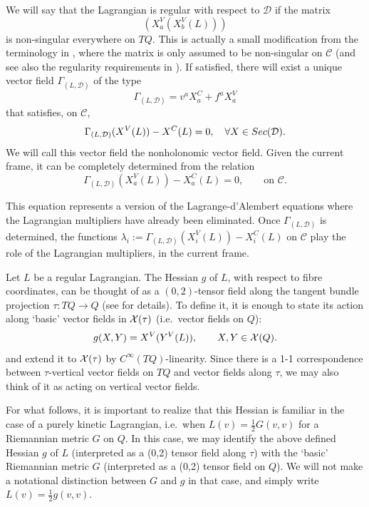 \documentclass[11pt]{article}
\def\cinfty#1{C^{\scriptscriptstyle\infty}(#1)}
\def\vectorfields#1{{\cal X}(#1)}
\def\D{{\mathcal D}}
\def\C{{\mathcal C}}
\def\GLD{{\Gamma_{(L,\mathcal{D})}}}
\begin{document}
We will say that the Lagrangian is regular with respect to $\D$ if the matrix
\[
\left(X^V_a(X^V_b(L))\right)
\]
is non-singular everywhere on $TQ$. This is actually a small modification from the terminology in \cite{anhol,Cartan}, where the matrix is only assumed to be non-singular on $\C$ (and see also the regularity requirements in \cite{deL,Cortes}). If satisfied, there will exist a unique vector field $\GLD$ of the type
$$
\Gamma_{(L,\mathcal{D})}=v^{a} X_{a}^C+f^{a} X_{a}^{V}
$$
that satisfies, on $\C$,  
$$
\Gamma_{(L,\mathcal{D})}(X^V(L))-X^C(L)=0 ,\quad\forall X\in{\rm Sec}(\mathcal{D}).
$$
We will call this vector field the nonholonomic vector field. Given the current frame, it can be completely determined from the relation
$$
\Gamma_{(L,\mathcal{D})}(X^V_a(L))-X^C_a(L)=0, \qquad \mbox{on $\C$}.
$$ 

This equation represents a version of the Lagrange-d'Alembert equations where the Lagrangian multipliers have already been eliminated. Once $\GLD$ is determined, the functions $\lambda_i:=\Gamma_{(L,\mathcal{D})}(X^V_i(L))-X^C_i(L)$ on $\C$ play the role of the Lagrangian multipliers, in the current frame.





Let $L$ be a regular Lagrangian. The Hessian $g$ of $L$, with respect to fibre coordinates, can be thought of as a $(0,2)$-tensor field along the tangent bundle projection $\tau:TQ\rightarrow Q$ (see \cite{anhol,Willysurvey} for details). To define it, it is enough to state its action along `basic' vector fields in $\vectorfields{\tau}$ (i.e.\ vector fields on $Q$): 
\[
g(X,Y) = X^V(Y^V(L)), \qquad X,Y\in\vectorfields{Q}.
\]
and extend it to $\vectorfields{\tau}$ by $\cinfty{TQ}$-linearity.
Since there is a 1-1 correspondence between $\tau$-vertical vector fields on $TQ$ and vector fields along $\tau$, we may also think of it as acting on vertical vector fields. 

For what follows, it is important to realize that this Hessian is familiar in the case of a  purely kinetic Lagrangian, i.e.\ when $L(v)=\frac{1}{2}G(v,v)$ for a Riemannian metric $G$ on $Q$. In this case, we may identify the above defined Hessian $g$ of $L$ (interpreted as a (0,2) tensor field along $\tau$) with the `basic' Riemannian metric $G$ (interpreted as a (0,2) tensor field on $Q$). We will not make a notational distinction between $G$ and $g$ in that case, and simply write  $L(v)=\frac{1}{2}g(v,v)$.
\end{document}
